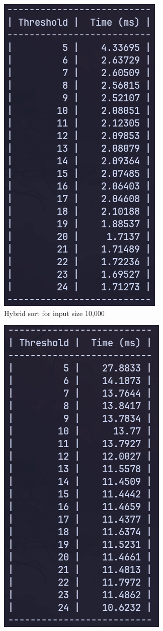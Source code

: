 \begin{figure}[H]
\begin{subfigure}[t]{0.4\textwidth}
        \includegraphics[scale=0.4]{img/task4/hi-10000.png}
        \caption{Hybrid sort for input size 10,000}
    \end{subfigure}
    \hfill
    \begin{subfigure}[t]{0.4\textwidth}
        \centering
        \includegraphics[scale=0.4]{img/task4/hi-50k.png}

\end{subfigure}
\end{figure}
